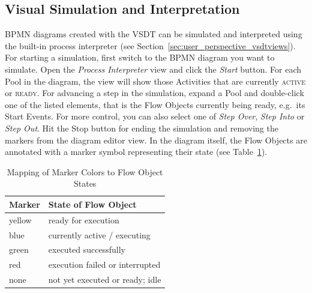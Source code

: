 
\subsection{Visual Simulation and Interpretation}
\label{sec:user_features_sim}

BPMN diagrams created with the VSDT can be simulated and interpreted using the
built-in process interpreter (see Section~\ref{sec:user_perspective_vsdtviews}).
For starting a simulation, first switch to the BPMN diagram you want to simulate.
Open the \emph{Process Interpreter} view and click the \emph{Start} button.  For
each Pool in the diagram, the view will show those Activities that are currently
\textsc{active} or \textsc{ready}.  For advancing a step in the simulation, expand
a Pool and double-click one of the listed elements, that is the Flow Objects
currently being ready, e.g.\ its Start Events.  For more control, you can also
select one of \emph{Step Over}, \emph{Step Into} or \emph{Step Out}.  Hit the
Stop button for ending the simulation and removing the markers from the diagram
editor view.  In the diagram itself, the Flow Objects are annotated with a marker
symbol representing their state (see Table~\ref{tab:markerColors}).

\begin{table}[ht]
	\centering
	\caption{Mapping of Marker Colors to Flow Object States}
	\begin{tabular}{ll}
		\hline
		\bf Marker & \bf State of Flow Object        \\
		\hline
		yellow     & ready for execution             \\
		blue       & currently active / executing    \\
		green      & executed successfully           \\
		red        & execution failed or interrupted \\
		none       & not yet executed or ready; idle \\
		\hline
	\end{tabular}
	\label{tab:markerColors}
\end{table}


